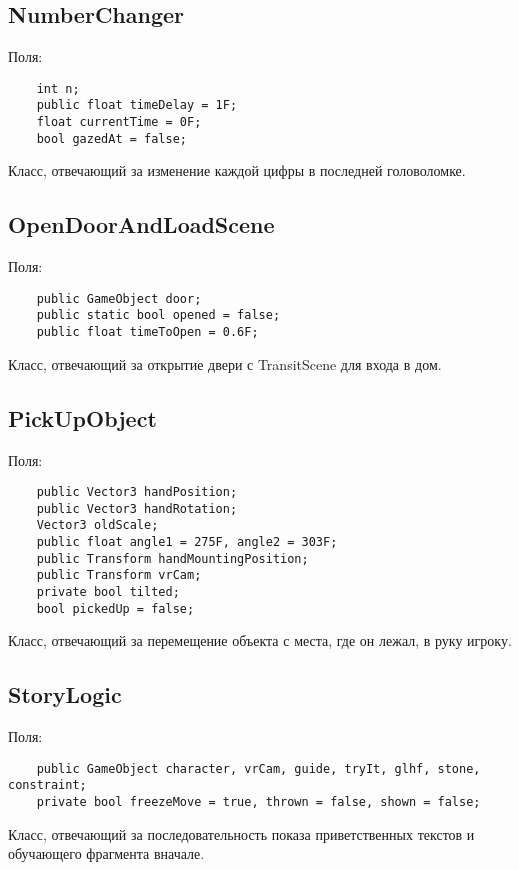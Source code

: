 \subsection{NumberChanger}
Поля:\\
\begin{small}
    \begin{verbatim}
    int n;
    public float timeDelay = 1F;
    float currentTime = 0F;
    bool gazedAt = false;
    \end{verbatim}
\end{small}
Класс, отвечающий за изменение каждой цифры в последней головоломке.  


\subsection{OpenDoorAndLoadScene}
Поля:\\
\begin{small}
    \begin{verbatim}
    public GameObject door;
    public static bool opened = false;
    public float timeToOpen = 0.6F;
    \end{verbatim}
\end{small}
Класс, отвечающий за открытие двери с TransitScene для входа в дом.

\subsection{PickUpObject}
Поля:\\
\begin{small}
    \begin{verbatim}
    public Vector3 handPosition;
    public Vector3 handRotation;
    Vector3 oldScale;
    public float angle1 = 275F, angle2 = 303F;
    public Transform handMountingPosition;
    public Transform vrCam;
    private bool tilted;
    bool pickedUp = false;
    \end{verbatim}
\end{small}
Класс, отвечающий за перемещение объекта с места, где он лежал, в руку игроку.

\subsection{StoryLogic}
Поля:\\
\begin{small}
    \begin{verbatim}
    public GameObject character, vrCam, guide, tryIt, glhf, stone, constraint;
    private bool freezeMove = true, thrown = false, shown = false;
    \end{verbatim}
\end{small}
Класс, отвечающий за последовательность показа приветственных текстов и обучающего фрагмента вначале.

